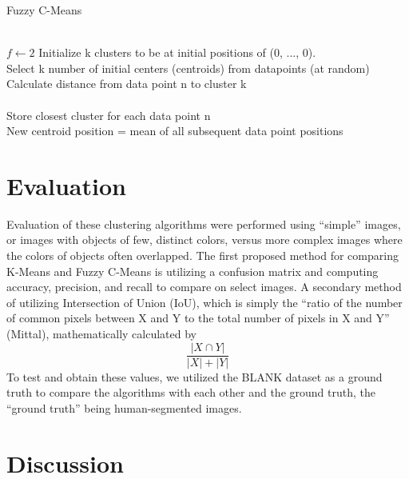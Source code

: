 \documentclass[10pt,twocolumn]{article}
\begin{document}
\begin{algorithm}
  \caption{ Fuzzy C-Means }
  \begin{algorithmic}[1] \\
    \State $f \gets 2$
    Initialize k clusters to be at initial positions of (0, ..., 0).\\
    Select k number of initial centers (centroids) from datapoints (at random)
       \\
        Calculate distance from data point n to cluster k \\
      \EndFor \\
        Store closest cluster for each data point n
     \EndFor \\
        New centroid position = mean of all subsequent data point positions
    \EndWhile
  \end{algorithmic}




\end{algorithm}




\section {Evaluation}

Evaluation of these clustering algorithms were performed using “simple” images, or images with objects of few, distinct colors, versus more complex images where the colors of objects often overlapped. The first proposed method for comparing K-Means and Fuzzy C-Means is utilizing a confusion matrix and computing accuracy, precision, and recall to compare on select images. A secondary method of utilizing Intersection of Union (IoU), which is simply the “ratio of the number of common pixels between X and Y to the total number of pixels in X and Y” (Mittal), mathematically calculated by \[ \frac{|X \cap Y|}{|X| + |Y|} \] To test and obtain these values, we utilized the BLANK dataset as a ground truth to compare the algorithms with each other and the ground truth, the “ground truth” being human-segmented images.

\section {Discussion}




\printbibliography
 
\end{document}
